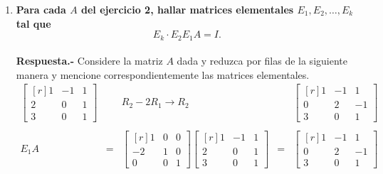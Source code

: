 \begin{enumerate}
    \item \textbf{\boldmath Para cada $A$ del ejercicio 2, hallar matrices elementales $E_1,E_2,\ldots,E_k$ tal que 
	$$E_k\cdot E_2E_1A=I.$$\\
    Respuesta.-}\; Considere la matriz $A$ dada y reduzca por filas de la siguiente manera y mencione correspondientemente las matrices elementales.
    $$\begin{array}{rcccc}
	\begin{bmatrix*}[r]
	    1 & -1 & 1\\
	    2 & 0 & 1\\
	    3 & 0 & 1
	\end{bmatrix*} && R_2-2R_1 \to R_2 & &
	\begin{bmatrix*}[r]
	    1 & -1 & 1\\
	    0 & 2 & -1\\
	    3 & 0 & 1
	\end{bmatrix*} \\\\
	E_1A&=&\begin{bmatrix*}[r]
	    1 & 0 & 0\\
	    -2 & 1 & 0\\
	    0 & 0 & 1
	\end{bmatrix*} 
	\begin{bmatrix*}[r]
	    1 & -1 & 1\\
	    2 & 0 & 1\\
	    3 & 0 & 1
	\end{bmatrix*} &=& 
	\begin{bmatrix*}[r]
	    1 & -1 & 1\\
	    0 & 2 & -1\\
	    3 & 0 & 1
	\end{bmatrix*} \\\\
    \end{array}$$


\end{enumerate}
